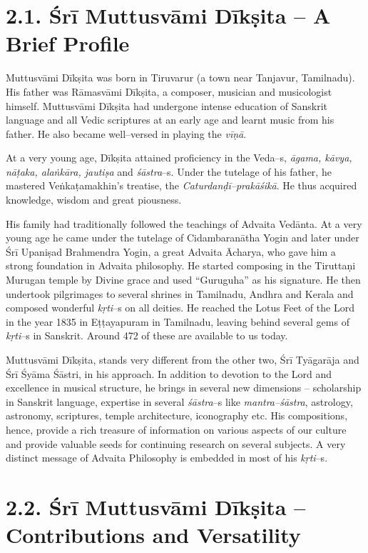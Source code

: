\section*{2.1. Śrī Muttusvāmi Dīkṣita – A Brief Profile}

Muttusvāmi Dīkṣita was born in Tiruvarur (a town near Tanjavur, Tamilnadu). His father was Rāmasvāmi Dīkṣita, a composer, musician and musicologist himself. Muttusvāmi Dīkṣita had undergone intense education of Sanskrit language and all Vedic scriptures at an early age and learnt music from his father. He also became well–versed in playing the \textit{vīṇā}.

At a very young age, Dīkṣita attained proficiency in the Veda–s, \textit{āgama, kāvya, nāṭaka, alaṅkāra, jautiṣa} and \textit{śāstra}–s. Under the tutelage of his father, he mastered Veṅkaṭamakhin’s treatise, the \textit{Caturdanḍī–prakāśikā}. He thus acquired knowledge, wisdom and great piousness.

His family had traditionally followed the teachings of Advaita Vedānta. At a very young age he came under the tutelage of Cidambaranātha Yogin and later under Śrī Upaniṣad Brahmendra Yogin, a great Advaita Ācharya, who gave him a strong foundation in Advaita philosophy. He started composing in the Tiruttaṇi Murugan temple by Divine grace and used “Guruguha” as his signature. He then undertook pilgrimages to several shrines in Tamilnadu, Andhra and Kerala and composed wonderful \textit{kṛti}–s on all deities. He reached the Lotus Feet of the Lord in the year 1835 in Eṭṭayapuram in Tamilnadu, leaving behind several gems of \textit{kṛti}–s in Sanskrit. Around 472 of these are available to us today.

Muttusvāmi Dīkṣita, stands very different from the other two, Śrī Tyāgarāja and Śrī Śyāma Śāstri, in his approach. In addition to devotion to the Lord and excellence in musical structure, he brings in several new dimensions – scholarship in Sanskrit language, expertise in several \textit{śāstra}–s like \textit{mantra–śāstra}, astrology, astronomy, scriptures, temple architecture, iconography etc. His compositions, hence, provide a rich treasure of information on various aspects of our culture and provide valuable seeds for continuing research on several subjects. A very distinct message of Advaita Philosophy is embedded in most of his \textit{kṛti}–s.


\section*{2.2. Śrī Muttusvāmi Dīkṣita – Contributions and Versatility}

